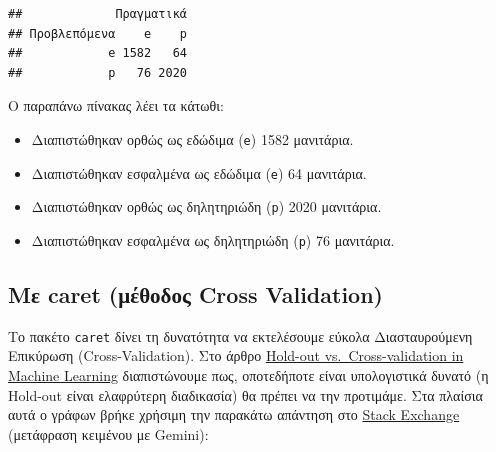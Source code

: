 \documentclass[
]{article}
\begin{document}
\begin{verbatim}
##             Πραγματικά
## Προβλεπόμενα    e    p
##            e 1582   64
##            p   76 2020
\end{verbatim}

Ο παραπάνω πίνακας λέει τα κάτωθι:

\begin{itemize}
\item
  Διαπιστώθηκαν ορθώς ως εδώδιμα (\texttt{e}) 1582 μανιτάρια.
\item
  Διαπιστώθηκαν εσφαλμένα ως εδώδιμα (\texttt{e}) 64 μανιτάρια.
\item
  Διαπιστώθηκαν ορθώς ως δηλητηριώδη (\texttt{p}) 2020 μανιτάρια.
\item
  Διαπιστώθηκαν εσφαλμένα ως δηλητηριώδη (\texttt{p}) 76 μανιτάρια.
\end{itemize}

\subsection{Με caret (μέθοδος Cross
Validation)}\label{ux3bcux3b5-caret-ux3bcux3adux3b8ux3bfux3b4ux3bfux3c2-cross-validation}

Το πακέτο \texttt{caret} δίνει τη δυνατότητα να εκτελέσουμε εύκολα
Διασταυρούμενη Επικύρωση (Cross-Validation). Στο άρθρο
\href{https://medium.com/@jaz1/holdout-vs-cross-validation-in-machine-learning-7637112d3f8f}{Hold-out
vs.~Cross-validation in Machine Learning} διαπιστώνουμε πως, οποτεδήποτε
είναι υπολογιστικά δυνατό (η Hold-out είναι ελαφρύτερη διαδικασία) θα
πρέπει να την προτιμάμε. Στα πλαίσια αυτά ο γράφων βρήκε χρήσιμη την
παρακάτω απάντηση στο
\href{https://stats.stackexchange.com/a/307849/295207}{Stack Exchange}
(μετάφραση κειμένου με Gemini):
\end{document}
